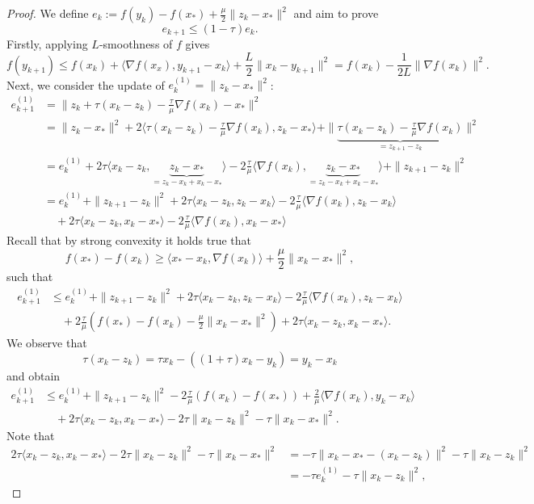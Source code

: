 \documentclass[12pt,openany]{book}
\theoremstyle{definition}
\theoremstyle{definition}
\begin{document}
\begin{proof}
We define $e_k := f(y_k)-f(x_\ast) + \frac{\mu}{2}\|z_k-x_\ast\|^2$ and aim to prove 
\[e_{k+1}\le (1-\tau) e_k. \]
Firstly, applying $L$-smoothness of $f$ gives
\begin{equation}\label{eq:NAM_strongconvex_aux1}
f(y_{k+1}) \le f(x_k) + \langle \nabla f(x_x), y_{k+1}-x_k\rangle + \frac{L}{2}\|x_k-y_{k+1}\|^2 = f(x_k) -\frac{1}{2L}\|\nabla f(x_k)\|^2.
\end{equation}
Next, we consider the update of $e_k^{(1)} = \|z_k-x_\ast\|^2$:
\begin{align*}
e_{k+1}^{(1)} &= \|z_k +\tau(x_k-z_k) -\frac{\tau}{\mu}\nabla f(x_k) - x_\ast\|^2\\
&= \|z_k-x_\ast\|^2 + 2\langle \tau (x_k-z_k)-\frac{\tau}{\mu}\nabla f(x_k), z_k - x_\ast\rangle + \|\underbrace{\tau(x_k-z_k) - \frac{\tau}{\mu}\nabla f(x_k)}_{=z_{k+1}-z_k} \|^2\\
&= e_k^{(1)} + 2\tau \langle x_k-z_k,\underbrace{z_k-x_\ast}_{=z_k-x_k+x_k-x_\ast}\rangle - 2\frac{\tau}{\mu} \langle \nabla f(x_k),\underbrace{z_k-x_\ast}_{=z_k-x_k+x_k-x_\ast}\rangle +\|z_{k+1}-z_k\|^2\\
&= e_k^{(1)}+ \|z_{k+1}-z_k\|^2 + 2\tau \langle x_k-z_k,z_k-x_k\rangle - 2\frac{\tau}{\mu}\langle \nabla f(x_k),z_k-x_k\rangle \\
&\quad+2\tau \langle x_k-z_k,x_k-x_\ast\rangle -2\frac{\tau}{\mu}\langle \nabla f(x_k), x_k-x_\ast\rangle 
\end{align*}
Recall that by strong convexity it holds true that
\[f(x_\ast)-f(x_k)\ge \langle x_\ast-x_k,\nabla f(x_k)\rangle + \frac{\mu}2 \|x_k-x_\ast\|^2, \]
such that
\begin{align*}
e_{k+1}^{(1)} &\le e_k^{(1)}+ \|z_{k+1}-z_k\|^2 + 2\tau \langle x_k-z_k,z_k-x_k\rangle - 2\frac{\tau}{\mu}\langle \nabla f(x_k),z_k-x_k\rangle \\
&\quad + 2\frac{\tau}{\mu} (f(x_\ast)-f(x_k)-\frac{\mu}2\|x_k-x_\ast\|^2) + 2\tau \langle x_k-z_k,x_k-x_\ast\rangle.
\end{align*}
We observe that
\[\tau(x_k-z_k) = \tau x_k -((1+\tau) x_k -y_k) = y_k-x_k \]
and obtain
\begin{align*} e_{k+1}^{(1)} &\le e_k^{(1)}+ \|z_{k+1}-z_k\|^2-2\frac{\tau}{\mu} (f(x_k)-f(x_\ast))+ \frac{2}{\mu}\langle \nabla f(x_k),y_k-x_k\rangle\\
&\quad+ 2\tau\langle x_k-z_k,x_k-x_\ast\rangle -2\tau\|x_k-z_k\|^2 -\tau\|x_k-x_\ast\|^2.
\end{align*}
Note that
\begin{align*}2\tau\langle x_k-z_k,x_k-x_\ast\rangle -2\tau\|x_k-z_k\|^2 -\tau\|x_k-x_\ast\|^2 &= -\tau \|x_k-x_\ast-(x_k-z_k)\|^2 - \tau \|x_k-z_k\|^2\\ &= -\tau e_k^{(1)} -\tau\|x_k-z_k\|^2,

\end{align*}
\end{proof}
\end{document}
